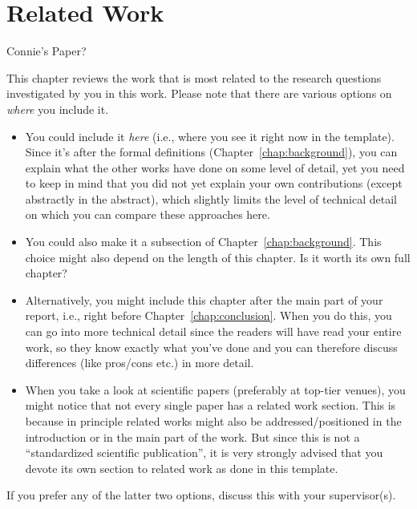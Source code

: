 \chapter{Related Work}\label{chap:relatedWork}

Connie's Paper?

This chapter reviews the work that is most related to the research questions investigated by you in this work. Please note that there are various options on \emph{where} you include it.

\begin{itemize}
  \item You could include it \emph{here} (i.e., where you see it right now in the template). Since it's after the formal definitions (Chapter~\ref{chap:background}), you can explain what the other works have done on some level of detail, yet you need to keep in mind that you did not yet explain your own contributions (except abstractly in the abstract), which slightly limits the level of technical detail on which you can compare these approaches here.
  
  \item You could also make it a subsection of Chapter~\ref{chap:background}. This choice might also depend on the length of this chapter. Is it worth its own full chapter?

  \item Alternatively, you might include this chapter after the main part of your report, i.e., right before Chapter~\ref{chap:conclusion}. When you do this, you can go into more technical detail since the readers will have read your entire work, so they know exactly what you've done and you can therefore discuss differences (like pros/cons etc.) in more detail.

  \item When you take a look at scientific papers (preferably at top-tier venues), you might notice that not every single paper has a related work section. This is because in principle related works might also be addressed/positioned in the introduction or in the main part of the work. But since this is not a ``standardized scientific publication'', it is very strongly advised that you devote its own section to related work as done in this template.
\end{itemize}

If you prefer any of the latter two options, discuss this with your supervisor(s).
